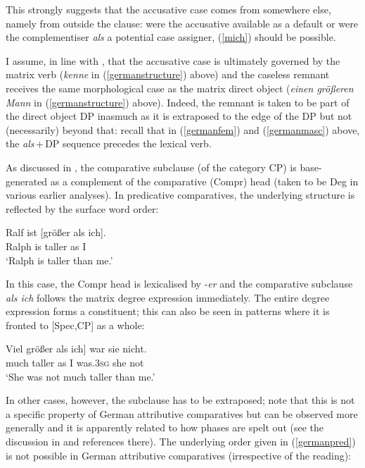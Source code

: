 This strongly suggests that the accusative case comes from somewhere else, namely from outside the clause: were the accusative available as a default or were the complementiser \textit{als} a potential case assigner, (\ref{mich}) should be possible.

I assume, in line with \citet{bacskaiatkari2017atoh}, that the accusative case is ultimately governed by the matrix verb (\textit{kenne} in (\ref{germanstructure}) above) and the caseless remnant receives the same morphological case as the matrix direct object (\textit{einen größeren Mann} in (\ref{germanstructure}) above). Indeed, the remnant is taken to be part of the direct object DP inasmuch as it is extraposed to the edge of the DP but not (necessarily) beyond that: recall that in (\ref{germanfem}) and (\ref{germanmasc}) above, the \textit{als}\,+\,DP sequence precedes the lexical verb.

As discussed in , the comparative subclause (of the category CP) is base-generated as a complement of the comparative (Compr) head (taken to be Deg in various earlier analyses). In predicative comparatives, the underlying structure is reflected by the surface word order:

\ea \gll Ralf ist [größer als ich]. \label{germanpred}\\
Ralph is \phantom{[}taller as I\\
\glt `Ralph is taller than me.'
\z

In this case, the Compr head is lexicalised by -\textit{er} and the comparative subclause \textit{als ich} follows the matrix degree expression immediately. The entire degree expression forms a constituent; this can also be seen in patterns where it is fronted to [Spec,CP] as a whole:

\ea \gll {[}Viel größer als ich] war sie nicht.\\
\phantom{[}much taller as I was.\textsc{3sg} she not\\
\glt `She was not much taller than me.'
\z

In other cases, however, the subclause has to be extraposed; note that this is not a specific property of German attributive comparatives but can be observed more generally and it is apparently related to how phases are spelt out (see the discussion in \citealt[53--56]{bacskaiatkari2018langsci} and references there). The underlying order given in (\ref{germanpred}) is not possible in German attributive comparatives (irrespective of the reading):

\ea[*]{\gll Ich kenne eine [größere als meine Mutter] Frau.\\
I know.\textsc{1sg} a.\textsc{f} \phantom{[}taller.\textsc{f} as my.\textsc{f} mother woman\\
\glt `I know a taller woman than my mother.'}
\z

